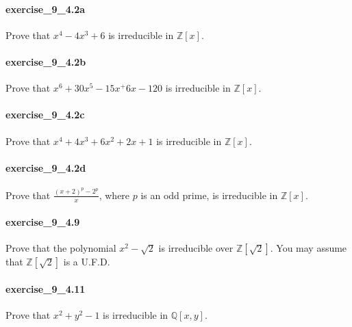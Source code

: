 \documentclass{article}
\begin{document}
\paragraph{exercise\_9\_4.2a} Prove that $x^4-4x^3+6$ is irreducible in $\mathbb{Z}[x]$.

\paragraph{exercise\_9\_4.2b} Prove that $x^6+30x^5-15x^+6x-120$ is irreducible in $\mathbb{Z}[x]$.

\paragraph{exercise\_9\_4.2c} Prove that $x^4+4x^3+6x^2+2x+1$ is irreducible in $\mathbb{Z}[x]$.

\paragraph{exercise\_9\_4.2d} Prove that $\frac{(x+2)^p-2^p}{x}$, where $p$ is an odd prime, is irreducible in $\mathbb{Z}[x]$.

\paragraph{exercise\_9\_4.9} Prove that the polynomial $x^{2}-\sqrt{2}$ is irreducible over $\mathbb{Z}[\sqrt{2}]$. You may assume that $\mathbb{Z}[\sqrt{2}]$ is a U.F.D.

\paragraph{exercise\_9\_4.11} Prove that $x^2+y^2-1$ is irreducible in $\mathbb{Q}[x,y]$.
\end{document}
